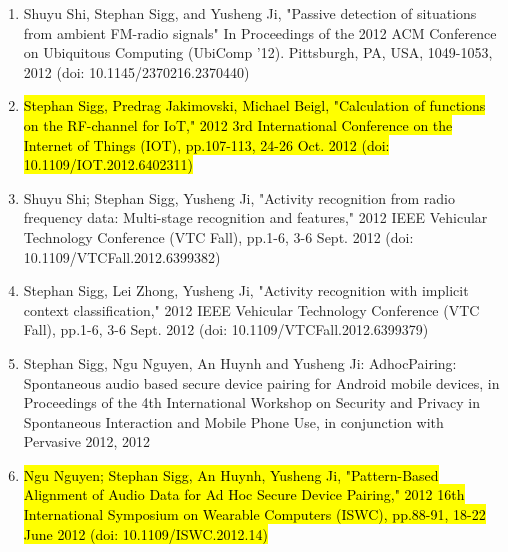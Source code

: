 \documentclass[12pt]{article}
\newcounter{saveenumi}
\begin{document}
\begin{enumerate}
\item Shuyu Shi, Stephan Sigg, and Yusheng Ji, "Passive detection of situations from ambient FM-radio signals" In Proceedings of the 2012 ACM Conference on Ubiquitous Computing (UbiComp '12). Pittsburgh, PA, USA, 1049-1053, 2012 (doi: 10.1145/2370216.2370440) 
\item \hl{Stephan Sigg, Predrag Jakimovski, Michael Beigl, "Calculation of functions on the RF-channel for IoT," 2012 3rd International Conference on the Internet of Things (IOT), pp.107-113, 24-26 Oct. 2012 (doi: 10.1109/IOT.2012.6402311)}
\item Shuyu Shi; Stephan Sigg, Yusheng Ji, "Activity recognition from radio frequency data: Multi-stage recognition and features," 2012 IEEE Vehicular Technology Conference (VTC Fall), pp.1-6, 3-6 Sept. 2012 (doi: 10.1109/VTCFall.2012.6399382)
\item Stephan Sigg, Lei Zhong, Yusheng Ji, "Activity recognition with implicit context classification," 2012 IEEE Vehicular Technology Conference (VTC Fall), pp.1-6, 3-6 Sept. 2012 (doi: 10.1109/VTCFall.2012.6399379)
\item Stephan Sigg, Ngu Nguyen, An Huynh and Yusheng Ji: AdhocPairing: Spontaneous audio based secure device pairing for Android mobile devices, in Proceedings of the 4th International Workshop on Security and Privacy in Spontaneous Interaction and Mobile Phone Use, in conjunction with Pervasive 2012, 2012
\item \hl{Ngu Nguyen; Stephan Sigg, An Huynh, Yusheng Ji, "Pattern-Based Alignment of Audio Data for Ad Hoc Secure Device Pairing," 2012 16th International Symposium on Wearable Computers (ISWC), pp.88-91, 18-22 June 2012 (doi: 10.1109/ISWC.2012.14)}
\setcounter{saveenumi}{\value{enumi}}
\end{enumerate}
\end{document}
